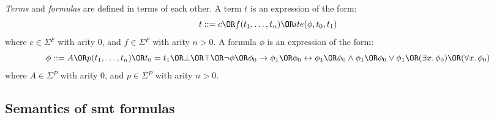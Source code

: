 \begin{definition}
  \textit{Terms} and \textit{formulas} are defined in terms of each other.
  A term $t$ is an expression of the form:
  \[t ::= c \OR f(t_1,\ldots,t_n) \OR ite(\phi{}, t_0, t_1)\]
  where $c \in \Sigma{}^F$ with arity 0, and $f \in \Sigma{}^F$ with arity
  $n > 0$.
  A formula $\phi{}$ is an expression of the form:
  \[\phi{} ::= A \OR p(t_1,\ldots,t_n) \OR t_0 = t_1
    \OR \bot{}
    \OR \top{}
    \OR \neg{}\phi{}
    \OR \phi{}_0 \rightarrow{} \phi{}_1
    \OR \phi{}_0 \leftrightarrow{} \phi{}_1
    \OR \phi{}_0 \land{} \phi{}_1
    \OR \phi{}_0 \lor{} \phi{}_1
    \OR (\exists{}x\ldotp\phi{}_0)
    \OR (\forall{}x\ldotp\phi{}_0)
  \]
  where $A \in \Sigma{}^P$ with arity 0, and $p \in \Sigma{}^P$ with arity
  $n > 0$.
  
\end{definition}

\begin{definition}[Atom]
\end{definition}

\begin{definition}[Literal]
\end{definition}

\begin{definition}[Clause]
\end{definition}

\begin{definition}
\end{definition}

\subsection{Semantics of \gls{smt} formulas}
\label{sec:smt-syntax}

\begin{definition}[Model]
\end{definition}

\begin{definition}[Interpretation]
\end{definition}

\begin{definition}[Satisfiability]
\end{definition}

\begin{definition}[Theory]
\end{definition}


